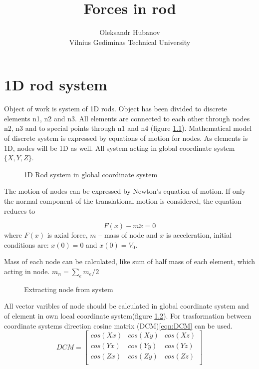 \documentclass[12pt]{report}
\begin{document}
\title{Forces in rod}
\author{Oleksandr Hubanov\\
Vilnius Gediminas Technical University}
\maketitle
\pagebreak
\chapter {1D rod system}
Object of work is system of 1D rods. Object has been divided to discrete elements n1, n2 and n3.
All elements are connected to each other through nodes n2, n3 and to special points through n1 and n4
(figure \ref{fig:rodSystem}). Mathematical model of discrete system is expressed by equations of motion for nodes.
As elements is 1D, nodes will be 1D as well. All system acting in global coordinate system $\{X, Y, Z\}$.\par
\par
\begin{figure}[ht]\label{fig:rodSystem}
  \centering
      
  \caption{1D Rod system in global coordinate system}      
\end{figure}
The motion of nodes can be expressed by Newton's equation of motion. If only the normal component of the translational
motion is considered, the equation reduces to\par
\begin{equation}\label{eqn:motionEq}
   F(x)-m\ddot{x}=0
\end{equation}
where $F(x)$ is axial force, $m$ – mass of node and $\ddot{x}$ is acceleration, initial conditions are: $x(0)=0$ and
$\dot{x}(0)=V_0$.\par
Mass of each node can be calculated, like sum of half mass of each element, which acting in node.
$m_n=\sum_{e}m_e/2$
\par
\begin{figure}[ht]\label{fig:nodeExtract}
  \centering
      
  \caption{Extracting node from system}    
\end{figure}
All vector varibles of node should be calculated in global coordinate system and of element in own local coordinate 
system(figure \ref{fig:nodeExtract}). For trasformation between coordinate systems direction cosine matrix
(DCM)\eqref{eqn:DCM} can be used.
\begin{equation}\label{eqn:DCM}
  DCM= \begin{bmatrix}
    cos(Xx)&cos(Xy)&cos(Xz)\\
    cos(Yx)&cos(Yy)&cos(Yz)\\
    cos(Zx)&cos(Zy)&cos(Zz)\\
   \end{bmatrix} 
\end{equation}
\end{document}
